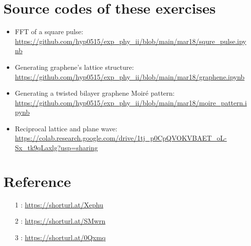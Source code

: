 \documentclass[12pt,a4paper]{article}
\begin{document}
\begin{CJK}{UTF8}{bkai}
\section{Source codes of these exercises}

\begin{itemize}
    \item FFT of a square pulse: \url{https://github.com/hyp0515/exp_phy_ii/blob/main/mar18/squre_pulse.ipynb}
    \item Generating graphene's lattice structure: \url{https://github.com/hyp0515/exp_phy_ii/blob/main/mar18/graphene.ipynb}
    \item Generating a twisted bilayer graphene Moiré pattern: \url{https://github.com/hyp0515/exp_phy_ii/blob/main/mar18/moire_pattern.ipynb}
    \item Reciprocal lattice and plane wave: \url{https://colab.research.google.com/drive/1tj_p0CpQVOKVBAET_oL-Sx_tk9qLaxlg?usp=sharing}
\end{itemize}

\clearpage
\section{Reference}\label{sec:reference}

\begin{itemize}
    \item [1]: \url{https://shorturl.at/Xephu}
    \item [2]: \url{https://shorturl.at/SMwrn}
    \item [3]: \url{https://shorturl.at/0Qxmq}
\end{itemize}


\end{CJK}
\end{document}
